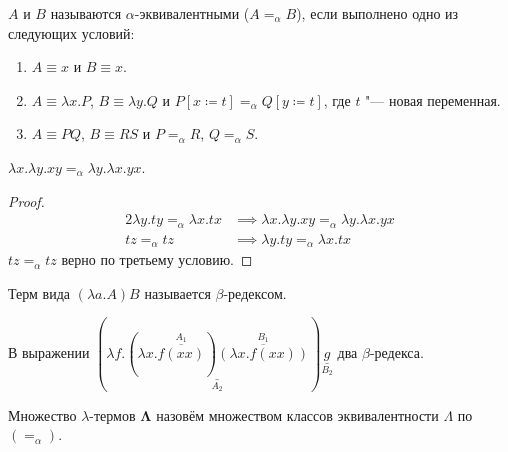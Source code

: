 \begin{definition}
    $A$ и $B$ называются $\alpha$-эквивалентными ($A=_{\alpha}B$), если выполнено одно из следующих условий:
    \begin{enumerate}
        \item $A\equiv{}x$ и $B\equiv{}x$.
        \item $A\equiv{}\lambda{}x.P$, $B\equiv{}\lambda{}y.Q$ и $P [x\coloneqq{}t] =_{\alpha}Q [y\coloneqq{}t]$, где $t$ "--- новая переменная.
        \item $A\equiv{}PQ$, $B\equiv{}RS$ и $P=_{\alpha}R$, $Q=_{\alpha}S$.
    \end{enumerate}
\end{definition}

\begin{example}
    $\lambda{}x.\lambda{}y.xy=_{\alpha}\lambda{}y.\lambda{}x.yx$.
    \begin{proof}
        \begin{alignat*}{2}
            \lambda{}y.ty=_{\alpha}\lambda{}x.tx &\implies \lambda{}x.\lambda{}y.xy=_{\alpha}\lambda{}y.\lambda{}x.yx \\
            tz=_{\alpha}tz &\implies \lambda{}y.ty=_{\alpha}\lambda{}x.tx
        \end{alignat*}
        $tz=_{\alpha}tz$ верно по третьему условию.
    \end{proof}
\end{example}

\begin{definition}
    Терм вида $\left(\lambda{}a.A\right)B$ называется $\beta$-редексом.
\end{definition}

\begin{example}
    В выражении
    $
        (
            \lambda{}f.
                \underset{A_2}{\underline{
                    (\lambda{}x.\overset{A_1}{\overline{f(xx)}})
                    \overset{B_1}{\overline{(\lambda{}x.f(xx))}}
                }}
        )\underset{B_2}{\underline{g}}
    $ два $\beta$-редекса.
\end{example}

\begin{definition}
    Множество $\lambda$-термов $\boldsymbol{\Lambda}$ назовём множеством классов эквивалентности $\Lambda$ по $(=_{\alpha})$.
\end{definition}

